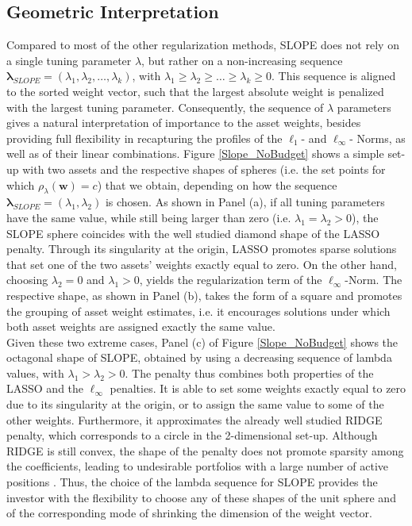 \documentclass[12pt, a4paper]{article}
\newcommand{\bfw}{\boldsymbol{w} }
\newcommand{\bflambda}{\boldsymbol{\lambda}}
\begin{document}
\subsection{Geometric Interpretation}%
Compared to most of the other regularization methods, SLOPE does not rely on a single tuning parameter $\lambda$, but rather on a non-increasing sequence $\bflambda_{SLOPE} = (\lambda_{1}, \lambda_{2}, \ldots,\lambda_{k})$, with $\lambda_{1}\geq \lambda_{2} \geq \ldots \geq \lambda_{k}\geq 0$. This sequence is aligned to the sorted weight vector, such that the largest absolute weight is penalized with the largest tuning parameter. Consequently, the sequence of $\lambda$ parameters gives a natural interpretation of importance to the asset weights, besides providing full flexibility in recapturing the profiles of the $\ell_{1}$- and $\ell_{\infty}$- Norms, as well as of their linear combinations. Figure \ref{Slope_NoBudget} shows a simple set-up with two assets and the respective shapes of spheres (i.e. the set points for which $\rho_\lambda(\bfw)=c$) that we obtain, depending on how the sequence $\bflambda_{SLOPE} = (\lambda_{1},\lambda_{2})$ is chosen. As shown in Panel (a), if all tuning parameters have the same value, while still being larger than zero (i.e. $\lambda_{1} = \lambda_{2} > 0$), the SLOPE sphere coincides with the well studied diamond shape of the LASSO penalty. Through its singularity at the origin, LASSO promotes sparse solutions that set one of the two assets' weights exactly equal to zero. On the other hand, choosing $\lambda_{2}=0$ and $\lambda_{1}>0$, yields the regularization term of the $\ell_{\infty}$-Norm. The respective shape, as shown in Panel (b), takes the form of a square and promotes the grouping of asset weight estimates, i.e. it encourages solutions under which both asset weights are assigned exactly the same value.\\
Given these two extreme cases, Panel (c) of Figure \ref{Slope_NoBudget} shows the octagonal shape of SLOPE, obtained by using a decreasing sequence of lambda values, with $\lambda_{1} > \lambda_{2} > 0$. The penalty thus combines both properties of the LASSO and the $\ell_{\infty}$ penalties. It is able to set some weights exactly equal to zero due to its singularity at the origin, or to assign the same value to some of the other weights. Furthermore, it approximates the already well studied RIDGE penalty, which corresponds to a circle in the 2-dimensional set-up. Although RIDGE is still convex, the shape of the penalty does not promote sparsity among the coefficients, leading to undesirable portfolios with a large number of active positions \citep{Carrasco2012, DeMiguel2009a}. Thus, the choice of the lambda sequence for SLOPE provides the investor with the flexibility to choose any of these shapes of the unit sphere and of the corresponding mode of shrinking the dimension of the weight vector.
\end{document}
